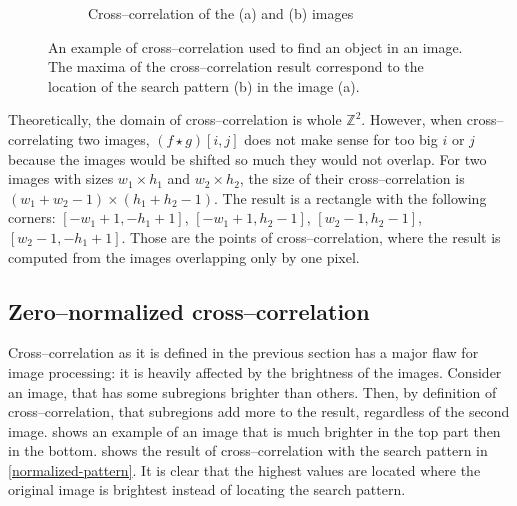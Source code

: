 \begin{figure}
\begin{subfigure}{.5\textwidth}
		\caption{Cross--correlation of the (a) and (b) images}
		\label{2d-correlation-example-result}
	\end{subfigure}
	
	\caption{An example of cross--correlation used to find an object in an image. The maxima of the cross--correlation result correspond to the location of the search pattern (b) in the image (a).}
	\label{2d-correlation-example}
\end{figure}

Theoretically, the domain of cross--correlation is whole $\mathbb{Z}^2$. However, when cross--correlating two images, $(f \star g)[i,j]$ does not make sense for too big $i$ or $j$ because the images would be shifted so much they would not overlap. For two images with sizes $w_1 \times h_1$ and $w_2 \times h_2$, the size of their cross--correlation is $(w_1 + w_2 - 1) \times (h_1 + h_2 - 1)$. The result is a rectangle with the following corners: $[-w_1+1,-h_1+1]$, $[-w_1+1,h_2-1]$, $[w_2-1,h_2-1]$, $[w_2-1,-h_1+1]$. Those are the points of cross--correlation, where the result is computed from the images overlapping only by one pixel.

\subsection{Zero--normalized cross--correlation}

Cross--correlation as it is defined in the previous section has a major flaw for image processing: it is heavily affected by the brightness of the images. Consider an image, that has some subregions brighter than others. Then, by definition of cross--correlation, that subregions add more to the result, regardless of the second image.  shows an example of an image that is much brighter in the top part then in the bottom.  shows the result of cross--correlation with the search pattern in \cref{normalized-pattern}. It is clear that the highest values are located where the original image is brightest instead of locating the search pattern.

